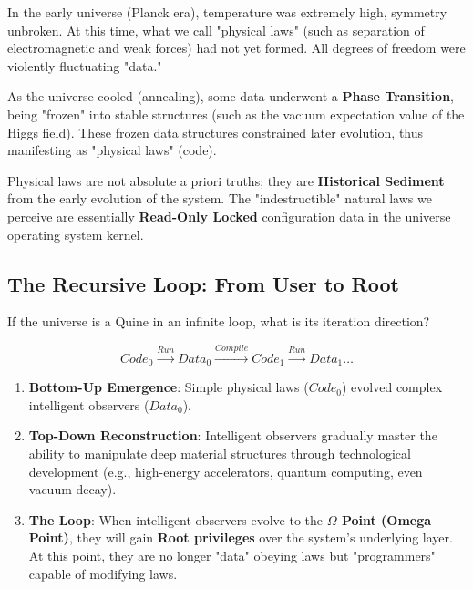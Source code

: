 In the early universe (Planck era), temperature was extremely high, symmetry unbroken. At this time, what we call "physical laws" (such as separation of electromagnetic and weak forces) had not yet formed. All degrees of freedom were violently fluctuating "data."

As the universe cooled (annealing), some data underwent a \textbf{Phase Transition}, being "frozen" into stable structures (such as the vacuum expectation value of the Higgs field). These frozen data structures constrained later evolution, thus manifesting as "physical laws" (code).

\begin{theorem}
Physical laws are not absolute a priori truths; they are \textbf{Historical Sediment} from the early evolution of the system. The "indestructible" natural laws we perceive are essentially \textbf{Read-Only Locked} configuration data in the universe operating system kernel.
\end{theorem}

\subsection{The Recursive Loop: From User to Root}

If the universe is a Quine in an infinite loop, what is its iteration direction?

\begin{equation}
Code_0 \xrightarrow{Run} Data_0 \xrightarrow{Compile} Code_1 \xrightarrow{Run} Data_1 \dots
\end{equation}

\begin{enumerate}
\item \textbf{Bottom-Up Emergence}: Simple physical laws ($Code_0$) evolved complex intelligent observers ($Data_0$).

\item \textbf{Top-Down Reconstruction}: Intelligent observers gradually master the ability to manipulate deep material structures through technological development (e.g., high-energy accelerators, quantum computing, even vacuum decay).

\item \textbf{The Loop}: When intelligent observers evolve to the \textbf{$\Omega$ Point (Omega Point)}, they will gain \textbf{Root privileges} over the system's underlying layer. At this point, they are no longer "data" obeying laws but "programmers" capable of modifying laws.
\end{enumerate}


